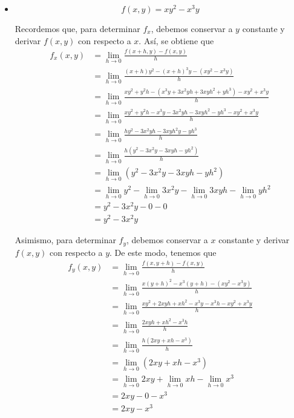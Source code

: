 \documentclass[12pt]{article}
\begin{document}
\begin{itemize}[format=\textbf]
\begin{itemize}[format=\textbf]

\item $$f(x, y) = xy^2 - x^3y$$

  Recordemos que, para determinar $f_x$, debemos conservar a $y$ constante y derivar $f (x, y)$ con respecto a $x$. Así, se obtiene que
  \begin{align*}
    f_x(x,y)
    &= \lim_{h\to 0} \frac{f(x+h,y)-f(x,y)}{h} \\
    &= \lim_{h\to 0} \frac{(x+h)y^2 - (x+h)^3y- (xy^2 - x^3y)}{h} \\
    &= \lim_{h\to 0} \frac{xy^2+y^2h - (x^3y+3x^2yh+3xyh^2+yh^3) - xy^2 + x^3y}{h} \\
    &= \lim_{h\to 0} \frac{xy^2+y^2h - x^3y - 3x^2yh -3xyh^2 -yh^3 - xy^2 + x^3y}{h} \\
    &= \lim_{h\to 0} \frac{hy^2 - 3x^2yh -3xyh^2y - yh^3}{h} \\
    &= \lim_{h\to 0} \frac{h(y^2 - 3x^2y -3xyh - yh^2)}{h} \\
    &= \lim_{h\to 0} (y^2 - 3x^2y - 3xyh - yh^2) \\
    &= \lim_{h\to 0} y^2 - \lim_{h\to 0}3x^2y - \lim_{h\to 0}3xyh - \lim_{h\to 0}yh^2 \\
    &= y^2 - 3x^2y - 0 - 0 \\
    &= y^2 - 3x^2y
  \end{align*}
    

  Asimismo, para determinar $f_y$, debemos conservar a $x$ constante y derivar $f(x,y)$ con respecto a $y$. De este modo, tenemos que
  \begin{align*}
    f_y(x,y)
    &= \lim_{h\to 0} \frac{f(x,y+h)-f(x,y)}{h} \\
    &= \lim_{h\to 0} \frac{x(y+h)^2 - x^3(y+h) - (xy^2 - x^3y)}{h} \\
    &= \lim_{h\to 0} \frac{xy^2 + 2xyh + xh^2 - x^3y - x^3h - xy^2 + x^3y}{h} \\
    &= \lim_{h\to 0} \frac{2xyh + xh^2 - x^3h}{h} \\
    &= \lim_{h\to 0} \frac{h(2xy + xh - x^3)}{h} \\
    &= \lim_{h\to 0} (2xy + xh - x^3) \\
    &= \lim_{h\to 0} 2xy + \lim_{h\to 0}xh - \lim_{h\to 0}x^3 \\
    &= 2xy - 0- x^3 \\
    &= 2xy - x^3
  \end{align*}

\end{itemize}


\end{itemize}
\end{document}
